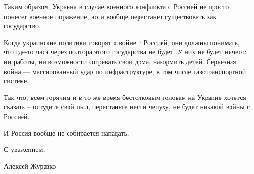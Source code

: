 Таким образом, Украина в случае военного конфликта с Россией не просто понесет
военное поражение, но и вообще перестанет существовать как государство. 

Когда украинские политики говорят о войне с Россией, они должны понимать, что
где-то часа через полтора этого государства не будет. У них не будет ничего: ни
работы, ни возможности согревать свои дома, накормить детей. Серьезная война —
массированный удар по инфраструктуре, в том числе газотранспортной системе.

Так что, всем горячим и в то же время бестолковым головам на Украине хочется
сказать – остудите свой пыл, перестаньте нести чепуху, не будет никакой войны с
Россией. 

И Россия вообще не собирается нападать. 

С уважением, 

Алексей Журавко

